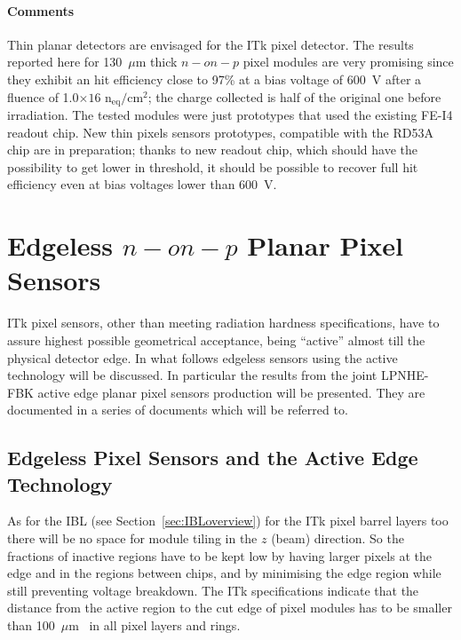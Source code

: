  

\paragraph{Comments}
Thin planar detectors are envisaged for the ITk pixel detector. The results reported here for 130~$\mu$m 
thick $n-on-p$ pixel modules are very promising since they exhibit an hit efficiency close to 
97\% at a bias voltage of 600~V after a fluence of 1.0$\times{16}$ n$_\text{eq}/\text{cm}^2$; 
the charge collected is half of the original one before irradiation.
 The tested 
modules were just 
prototypes that used the existing FE-I4 readout chip. New thin pixels sensors prototypes, compatible 
with the RD53A chip are in preparation; thanks to new readout chip, which should have 
the possibility to get lower in threshold, it should be possible to recover full hit efficiency even at  
bias voltages lower than 600~V. 
 

\section{Edgeless $n-on-p$ Planar Pixel Sensors}
\label{sec:edgeless}

ITk pixel sensors, other than meeting radiation hardness specifications, have to assure highest 
possible geometrical acceptance, being ``active'' almost till the physical detector edge.
In what follows edgeless sensors using the active technology will be discussed.  
In particular the results from the joint LPNHE-FBK  active edge planar pixel sensors production will be presented. They are documented in a series of documents which will be referred to.

\subsection{Edgeless Pixel Sensors and the Active Edge Technology}

As for the IBL (see Section~\ref{sec:IBLoverview}) for the ITk pixel barrel layers too there will be no 
space for module tiling in the $z$ (beam) direction. So the fractions of inactive regions have to be kept 
low by having larger pixels at the edge and in the regions between chips, and by minimising the edge 
region while still preventing voltage breakdown. 
 The ITk specifications indicate that the distance from the active region to the cut edge of pixel modules has to be smaller than 100~$\mu$m~\cite{ITkStripsTDR} in all pixel layers and rings.



